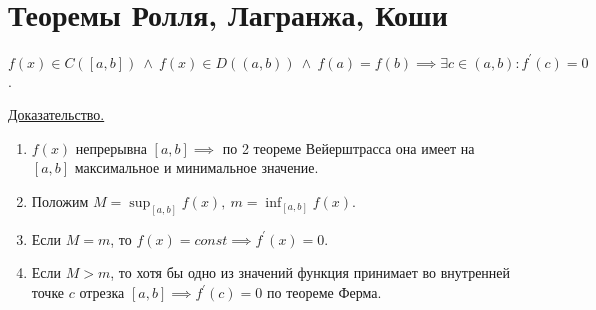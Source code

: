 \documentclass{article}
\begin{document}
\section{Теоремы Ролля, Лагранжа, Коши}

\begin{theorem}[Ролля]
    \(f(x) \in C({[a, b]})\ \land\ f(x) \in D((a, b))\ \land\ f(a) = f(b) \implies \exists c \in (a, b): f^{\prime}(c) = 0\). 
\end{theorem}
\noindent \underline{Доказательство.}
\begin{enumerate}
    \item \(f(x)\) непрерывна \({[a, b]} \implies \) по 2 теореме Вейерштрасса она имеет на \({[a, b]}\) максимальное и минимальное значение.
    \item Положим \(\displaystyle M = \sup_{[a, b]}f(x),\ m = \inf_{[a, b]}f(x)\).
    \item Если \(M = m\), то \(f(x) = const \implies f^{\prime}(x) = 0\).
    \item Если \(M > m\), то хотя бы одно из значений функция принимает во внутренней точке \(c\) отрезка \({[a, b]} \implies f^{\prime}(c) = 0\) по теореме Ферма.
\end{enumerate}
\end{document}
